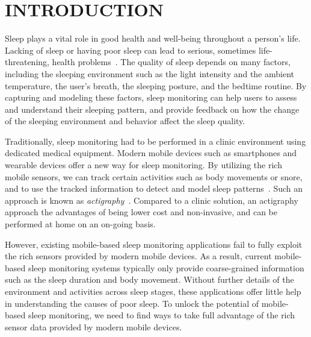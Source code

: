 \section{INTRODUCTION}\label{sec:1introduction}

Sleep plays a vital role in good health and well-being throughout a person's life. Lacking of sleep or having poor sleep can lead to
serious, sometimes life-threatening, health problems~\cite{altena2008sleep,chandola2010effect,lallukka2016contribution}. The quality of
sleep depends on many factors, including the sleeping environment such as the light intensity and the ambient temperature, the user's
breath, the sleeping posture, and the bedtime routine. By capturing and modeling these factors, sleep monitoring can help users to assess
and understand their sleeping pattern, and provide feedback on how the change of the sleeping environment and behavior affect the sleep
quality.

Traditionally, sleep monitoring had to be performed in a clinic environment using dedicated medical equipment.  Modern mobile devices such
as smartphones and wearable devices offer a new way for sleep monitoring. By utilizing the rich mobile sensors, we can track certain
activities such as body movements or snore, and to use the tracked information to detect and model sleep
patterns~\cite{zeo,Jawbone,SleepAndroid,fitbit,gu2016sleep}. Such an approach is known as
\emph{actigraphy}~\cite{Actigraphy,ancoli2003role}. Compared to a clinic solution, an actigraphy approach the advantages of being lower
cost and non-invasive, and can be performed at home on an on-going basis.


However, existing mobile-based sleep monitoring applications fail to fully exploit the rich sensors provided by modern mobile devices. As a
result, current mobile-based sleep monitoring systems typically only provide coarse-grained information such as the sleep duration and body
movement. Without further details of the environment and activities across sleep stages, these applications offer little help in
understanding the causes of poor sleep. To unlock the potential of mobile-based sleep monitoring, we need to find ways to take full
advantage of the rich sensor data provided by modern mobile devices.


